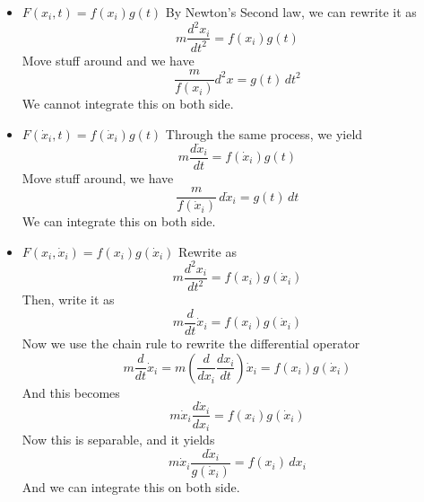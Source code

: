 \documentclass[12pt]{article}
\newcommand{\dydx}[2]{\frac{d #1}{d #2}}
\newcommand{\paren}[1]{\left( #1 \right)}
\begin{document}
\begin{enumerate}
        \begin{itemize}
            \item[(a)] $F(x_i, t) = f(x_i) g(t)$
            By Newton's Second law, we can rewrite it as
            \[
            m\dydx{^2x_i}{t^2} = f(x_i)g(t)
            \]
            Move stuff around and we have
            \[
            \frac{m}{f(x_i)}d^2x = g(t)\,dt^2
            \]
            We cannot integrate this on both side.
            \item[(b)] $F(\dot{x}_i, t) = f(\dot{x}_i) g(t)$
            Through the same process, we yield 
            \[
            m\dydx{\dot{x}_i}{t} = f(\dot{x}_i)g(t)
            \]
            Move stuff around, we have
            \[
            \frac{m}{f(\dot{x}_i)} \,d\dot{x}_i = g(t)\,dt
            \]
            We can integrate this on both side. 
            \item[(c)] $F(x_i, \dot{x}_i) = f(x_i) g(\dot{x}_i)$
            Rewrite as
            \[
            m\dydx{^2x_i}{t^2} = f(x_i) g(\dot{x}_i)
            \]
            Then, write it as
            \[
            m\dydx{}{t}\dot{x}_i = f(x_i) g(\dot{x}_i)
            \]
            Now we use the chain rule to rewrite the differential operator
            \[
            m\dydx{}{t}\dot{x}_i  = m\paren{\dydx{}{x_i}\dydx{x_i}{t} }\dot{x}_i= f(x_i) g(\dot{x}_i)
            \]
            And this becomes
            \[
            m\dot{x}_i\dydx{\dot{x}_i}{x_i} = f(x_i) g(\dot{x}_i)
            \]
            Now this is separable, and it yields
            \[
            m\dot{x}_i\frac{d\dot{x}_i}{g(\dot{x}_i)} = f(x_i)\,dx_i
            \]
            And we can integrate this on both side. 
            
        \end{itemize}


    

    

    
    
        

        
        
        
                    
    

        



        





\end{enumerate}
\end{document}
